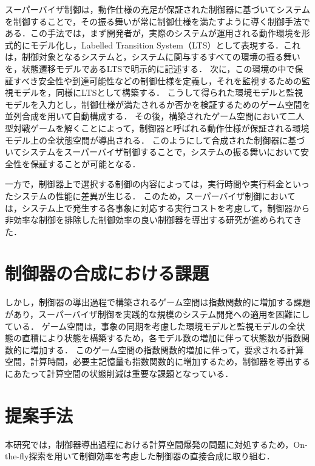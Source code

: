 \documentclass[11pt]{jarticle}
\begin{document}
スーパーバイザ制御は，動作仕様の充足が保証された制御器に基づいてシステムを制御することで，その振る舞いが常に制御仕様を満たすように導く制御手法である．この手法では，まず開発者が，実際のシステムが運用される動作環境を形式的にモデル化し，Labelled Transition System（LTS）として表現する．これは，制御対象となるシステムと，システムに関与するすべての環境の振る舞いを，状態遷移モデルであるLTSで明示的に記述する．
次に，この環境の中で保証すべき安全性や到達可能性などの制御仕様を定義し，それを監視するための監視モデルを，同様にLTSとして構築する．
こうして得られた環境モデルと監視モデルを入力とし，制御仕様が満たされるか否かを検証するためのゲーム空間を並列合成を用いて自動構成する．
その後，構築されたゲーム空間において二人型対戦ゲームを解くことによって，制御器と呼ばれる動作仕様が保証される環境モデル上の全状態空間が導出される．
このようにして合成された制御器に基づいてシステムをスーパーバイザ制御することで，システムの振る舞いにおいて安全性を保証することが可能となる．

一方で，制御器上で選択する制御の内容によっては，実行時間や実行料金といったシステムの性能に差異が生じる．
このため，スーパーバイザ制御においては，システム上で発生する各事象に対応する実行コストを考慮して，制御器から非効率な制御を排除した制御効率の良い制御器を導出する研究が進められてきた\cite{eze}．


\section{制御器の合成における課題}
しかし，制御器の導出過程で構築されるゲーム空間は指数関数的に増加する課題があり，スーパーバイザ制御を実践的な規模のシステム開発への適用を困難にしている．
ゲーム空間は，事象の同期を考慮した環境モデルと監視モデルの全状態の直積により状態を構築するため，各モデル数の増加に伴って状態数が指数関数的に増加する．
このゲーム空間の指数関数的増加に伴って，要求される計算空間，計算時間，必要主記憶量も指数関数的に増加するため，制御器を導出するにあたって計算空間の状態削減は重要な課題となっている．


\section{提案手法}
本研究では，制御器導出過程における計算空間爆発の問題に対処するため，On-the-fly探索を用いて制御効率を考慮した制御器の直接合成に取り組む．
\end{document}
